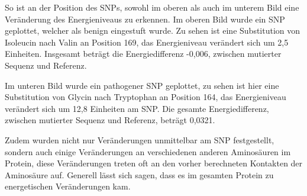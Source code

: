 %
So ist an der Position des \ac{SNP}s, sowohl im oberen als auch im unterem Bild eine Veränderung des Energieniveaus zu erkennen. Im oberen Bild wurde ein \ac{SNP} geplottet, welcher als benign eingestuft wurde. Zu sehen ist eine Substitution von Isoleucin nach Valin an Position 169, das Energieniveau verändert sich um 2,5 Einheiten. Insgesamt beträgt die Energiedifferenz -0,006, zwischen mutierter Sequenz und Referenz.

Im unteren Bild wurde ein pathogener \ac{SNP} geplottet, zu sehen ist hier eine Substitution von Glycin nach Tryptophan an Position 164, das Energieniveau verändert sich um 12,8 Einheiten am \ac{SNP}. Die gesamte Energiedifferenz, zwischen mutierter Sequenz und Referenz, beträgt 0,0321.

Zudem wurden nicht nur Veränderungen unmittelbar am \ac{SNP} festgestellt, sondern auch einige Veränderungen an verschiedenen anderen Aminosäuren im Protein, diese Veränderungen treten oft an den vorher berechneten Kontakten der Aminosäure auf. Generell lässt sich sagen, dass es im gesamten Protein zu energetischen Veränderungen kam.

